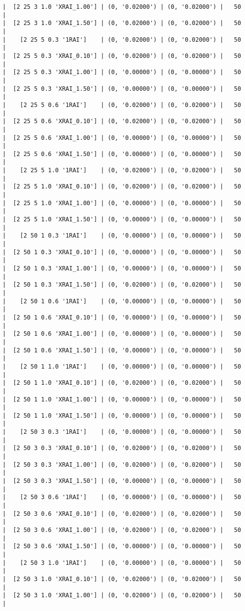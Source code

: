 \documentclass{article}
\begin{document}
\begin{verbatim}
|  [2 25 3 1.0 'XRAI_1.00'] | (0, '0.02000') | (0, '0.02000') |   50  |
|  [2 25 3 1.0 'XRAI_1.50'] | (0, '0.02000') | (0, '0.02000') |   50  |
|    [2 25 5 0.3 '1RAI']    | (0, '0.02000') | (0, '0.02000') |   50  |
|  [2 25 5 0.3 'XRAI_0.10'] | (0, '0.02000') | (0, '0.02000') |   50  |
|  [2 25 5 0.3 'XRAI_1.00'] | (0, '0.00000') | (0, '0.00000') |   50  |
|  [2 25 5 0.3 'XRAI_1.50'] | (0, '0.00000') | (0, '0.00000') |   50  |
|    [2 25 5 0.6 '1RAI']    | (0, '0.02000') | (0, '0.02000') |   50  |
|  [2 25 5 0.6 'XRAI_0.10'] | (0, '0.02000') | (0, '0.02000') |   50  |
|  [2 25 5 0.6 'XRAI_1.00'] | (0, '0.00000') | (0, '0.00000') |   50  |
|  [2 25 5 0.6 'XRAI_1.50'] | (0, '0.00000') | (0, '0.00000') |   50  |
|    [2 25 5 1.0 '1RAI']    | (0, '0.02000') | (0, '0.02000') |   50  |
|  [2 25 5 1.0 'XRAI_0.10'] | (0, '0.02000') | (0, '0.02000') |   50  |
|  [2 25 5 1.0 'XRAI_1.00'] | (0, '0.00000') | (0, '0.00000') |   50  |
|  [2 25 5 1.0 'XRAI_1.50'] | (0, '0.00000') | (0, '0.00000') |   50  |
|    [2 50 1 0.3 '1RAI']    | (0, '0.00000') | (0, '0.00000') |   50  |
|  [2 50 1 0.3 'XRAI_0.10'] | (0, '0.00000') | (0, '0.00000') |   50  |
|  [2 50 1 0.3 'XRAI_1.00'] | (0, '0.00000') | (0, '0.00000') |   50  |
|  [2 50 1 0.3 'XRAI_1.50'] | (0, '0.02000') | (0, '0.02000') |   50  |
|    [2 50 1 0.6 '1RAI']    | (0, '0.00000') | (0, '0.00000') |   50  |
|  [2 50 1 0.6 'XRAI_0.10'] | (0, '0.00000') | (0, '0.00000') |   50  |
|  [2 50 1 0.6 'XRAI_1.00'] | (0, '0.00000') | (0, '0.00000') |   50  |
|  [2 50 1 0.6 'XRAI_1.50'] | (0, '0.00000') | (0, '0.00000') |   50  |
|    [2 50 1 1.0 '1RAI']    | (0, '0.00000') | (0, '0.00000') |   50  |
|  [2 50 1 1.0 'XRAI_0.10'] | (0, '0.02000') | (0, '0.02000') |   50  |
|  [2 50 1 1.0 'XRAI_1.00'] | (0, '0.00000') | (0, '0.00000') |   50  |
|  [2 50 1 1.0 'XRAI_1.50'] | (0, '0.00000') | (0, '0.00000') |   50  |
|    [2 50 3 0.3 '1RAI']    | (0, '0.00000') | (0, '0.00000') |   50  |
|  [2 50 3 0.3 'XRAI_0.10'] | (0, '0.02000') | (0, '0.02000') |   50  |
|  [2 50 3 0.3 'XRAI_1.00'] | (0, '0.02000') | (0, '0.02000') |   50  |
|  [2 50 3 0.3 'XRAI_1.50'] | (0, '0.00000') | (0, '0.00000') |   50  |
|    [2 50 3 0.6 '1RAI']    | (0, '0.00000') | (0, '0.00000') |   50  |
|  [2 50 3 0.6 'XRAI_0.10'] | (0, '0.02000') | (0, '0.02000') |   50  |
|  [2 50 3 0.6 'XRAI_1.00'] | (0, '0.02000') | (0, '0.02000') |   50  |
|  [2 50 3 0.6 'XRAI_1.50'] | (0, '0.00000') | (0, '0.00000') |   50  |
|    [2 50 3 1.0 '1RAI']    | (0, '0.00000') | (0, '0.00000') |   50  |
|  [2 50 3 1.0 'XRAI_0.10'] | (0, '0.02000') | (0, '0.02000') |   50  |
|  [2 50 3 1.0 'XRAI_1.00'] | (0, '0.02000') | (0, '0.02000') |   50  |

\end{verbatim}
\end{document}
